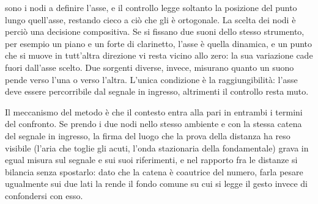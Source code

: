 \documentclass{article}
\begin{document}

sono i nodi a definire l'asse, e il controllo legge soltanto la posizione del punto lungo quell'asse, restando cieco a ciò che gli è ortogonale. La scelta dei nodi è perciò una decisione compositiva. Se si fissano due suoni dello stesso strumento, per esempio un piano e un forte di clarinetto, l'asse è quella dinamica, e un punto che si muove in tutt'altra direzione vi resta vicino allo zero: la sua variazione cade fuori dall'asse scelto. Due sorgenti diverse, invece, misurano quanto un suono pende verso l'una o verso l'altra. L'unica condizione è la raggiungibilità: l'asse deve essere percorribile dal segnale in ingresso, altrimenti il controllo resta muto. %

Il meccanismo del metodo è che il contesto entra alla pari in entrambi i termini del confronto. Se prendo i due nodi nello stesso ambiente e con la stessa catena del segnale in ingresso, la firma del luogo che la prova della distanza ha reso visibile (l'aria che toglie gli acuti, l'onda stazionaria della fondamentale) grava in egual misura sul segnale e sui suoi riferimenti, e nel rapporto fra le distanze si bilancia senza spostarlo: dato che la catena è coautrice del numero, farla pesare ugualmente sui due lati la rende il fondo comune su cui si legge il gesto invece di confondersi con esso.
\end{document}
